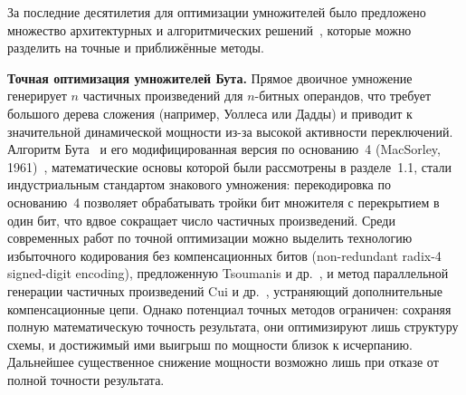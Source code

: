 \documentclass[a4paper, 12pt, oneside]{report}
\begin{document}
За последние десятилетия для оптимизации умножителей было предложено
множество архитектурных и алгоритмических решений~\cite{jiang2020}, которые
можно разделить на точные и приближённые методы.

\textbf{Точная оптимизация умножителей Бута.} Прямое двоичное
умножение генерирует $n$ частичных произведений для $n$-битных
операндов, что требует большого дерева сложения (например, Уоллеса
или Дадды) и приводит к значительной динамической мощности из-за
высокой активности переключений. Алгоритм Бута~\cite{booth1951} и его
модифицированная версия по основанию~4 (MacSorley, 1961)~\cite{macsorley1961},
математические основы которой были рассмотрены в разделе~1.1, стали
индустриальным стандартом знакового умножения: перекодировка
по основанию~4 позволяет обрабатывать тройки бит множителя с перекрытием в
один бит, что вдвое сокращает число частичных произведений. Среди
современных работ по точной оптимизации можно выделить технологию
избыточного кодирования без компенсационных битов (non-redundant
radix-4 signed-digit encoding), предложенную Tsoumanis и
др.~\cite{tsoumanis2016}, и метод параллельной генерации частичных
произведений Cui и др.~\cite{cui2016}, устраняющий дополнительные
компенсационные цепи. Однако потенциал точных методов ограничен: сохраняя
полную математическую точность результата, они оптимизируют лишь структуру
схемы, и достижимый ими выигрыш по мощности близок к исчерпанию. Дальнейшее
существенное снижение мощности возможно лишь при отказе от полной точности
результата.
\end{document}
